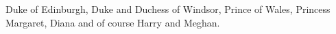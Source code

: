 
Duke of Edinburgh, Duke and Duchess of Windsor, Prince of Wales, Princess Margaret, Diana and of course Harry and Meghan.

